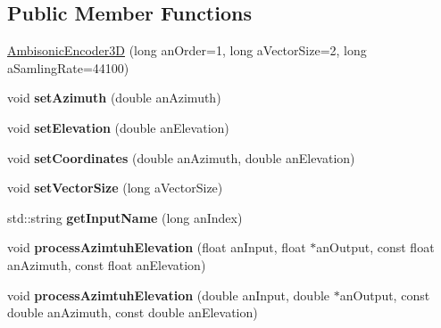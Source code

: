 \subsection*{Public Member Functions}
\begin{DoxyCompactItemize}
\item 
\hyperlink{class_ambisonic_encoder3_d_a0ac92c8587d23ad19d903d3e6ac01f8a}{Ambisonic\-Encoder3\-D} (long an\-Order=1, long a\-Vector\-Size=2, long a\-Samling\-Rate=44100)
\item 
\hypertarget{class_ambisonic_encoder3_d_a017def4884bc8617d5252446f0be29f6}{void {\bfseries set\-Azimuth} (double an\-Azimuth)}\label{class_ambisonic_encoder3_d_a017def4884bc8617d5252446f0be29f6}

\item 
\hypertarget{class_ambisonic_encoder3_d_a973523ca797d83dc131c593bca3eb1ad}{void {\bfseries set\-Elevation} (double an\-Elevation)}\label{class_ambisonic_encoder3_d_a973523ca797d83dc131c593bca3eb1ad}

\item 
\hypertarget{class_ambisonic_encoder3_d_a3335af062603c9ea93530beed9773cd7}{void {\bfseries set\-Coordinates} (double an\-Azimuth, double an\-Elevation)}\label{class_ambisonic_encoder3_d_a3335af062603c9ea93530beed9773cd7}

\item 
\hypertarget{class_ambisonic_encoder3_d_a4dbe96f451de3180d1cf23d2c32454be}{void {\bfseries set\-Vector\-Size} (long a\-Vector\-Size)}\label{class_ambisonic_encoder3_d_a4dbe96f451de3180d1cf23d2c32454be}

\item 
\hypertarget{class_ambisonic_encoder3_d_a62e241b0eed575a696fa5ffb56c72ab9}{std\-::string {\bfseries get\-Input\-Name} (long an\-Index)}\label{class_ambisonic_encoder3_d_a62e241b0eed575a696fa5ffb56c72ab9}

\item 
\hypertarget{class_ambisonic_encoder3_d_aa832c42167482fdbb83aedcd79c7f89d}{void {\bfseries process\-Azimtuh\-Elevation} (float an\-Input, float $\ast$an\-Output, const float an\-Azimuth, const float an\-Elevation)}\label{class_ambisonic_encoder3_d_aa832c42167482fdbb83aedcd79c7f89d}

\item 
\hypertarget{class_ambisonic_encoder3_d_ac8d1dc3cc5fe0d8e5fcb1848655dac8a}{void {\bfseries process\-Azimtuh\-Elevation} (double an\-Input, double $\ast$an\-Output, const double an\-Azimuth, const double an\-Elevation)}\label{class_ambisonic_encoder3_d_ac8d1dc3cc5fe0d8e5fcb1848655dac8a}


\end{DoxyCompactItemize}
